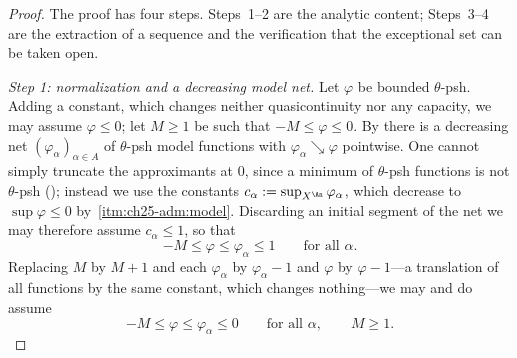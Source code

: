 \begin{proof}
The proof has four steps.  Steps~1--2 are the analytic content; Steps~3--4
are the extraction of a sequence and the verification that the exceptional
set can be taken open.

\emph{Step 1: normalization and a decreasing model net.}  Let \(\varphi\) be
bounded \(\theta\)-psh.  Adding a constant, which changes neither
quasicontinuity nor any capacity, we may assume \(\varphi\leq0\); let
\(M\geq1\) be such that \(-M\leq\varphi\leq0\).  By
 there is a decreasing net
\((\varphi_\alpha)_{\alpha\in A}\) of \(\theta\)-psh model functions with
\(\varphi_\alpha\searrow\varphi\) pointwise.  One cannot simply truncate the
approximants at \(0\), since a minimum of \(\theta\)-psh functions is not
\(\theta\)-psh (); instead we use the constants
\(c_\alpha:=\sup_{X^{\An}}\varphi_\alpha\), which decrease to
\(\sup\varphi\leq0\) by
\,\cref{itm:ch25-adm:model}.  Discarding an
initial segment of the net we may therefore assume \(c_\alpha\leq1\), so that
\begin{equation}
\label{eq:ch25-qc-normalization}
 -M\leq\varphi\leq\varphi_\alpha\leq1
 \qquad\text{for all }\alpha .
\end{equation}
Replacing \(M\) by \(M+1\) and each \(\varphi_\alpha\) by
\(\varphi_\alpha-1\) and \(\varphi\) by \(\varphi-1\)---a translation of all
functions by the same constant, which changes nothing---we may and do assume
\begin{equation}
\label{eq:ch25-qc-normalization-two}
 -M\leq\varphi\leq\varphi_\alpha\leq0
 \qquad\text{for all }\alpha ,\qquad M\geq1 .
\end{equation}


\end{proof}
